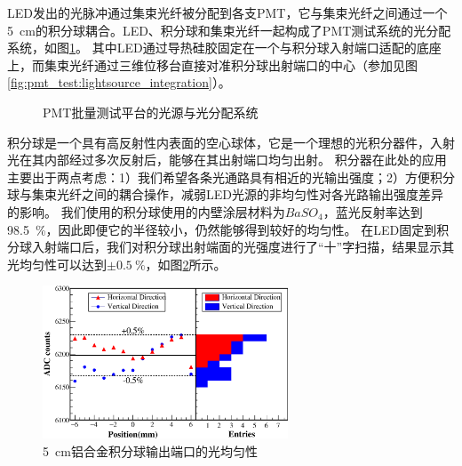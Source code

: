LED发出的光脉冲通过集束光纤被分配到各支PMT，它与集束光纤之间通过一个\SI{5}{\centi\meter}的积分球耦合。LED、积分球和集束光纤一起构成了PMT测试系统的光分配系统，如图\ref{fig:pmt_test:light_distribution}。
其中LED通过导热硅胶固定在一个与积分球入射端口适配的底座上，而集束光纤通过三维位移台直接对准积分球出射端口的中心（参加见图\ref{fig:pmt_test:lightsource_integration}）。
\begin{figure}[htbp]
	\centering
	\caption{PMT批量测试平台的光源与光分配系统}
	\label{fig:pmt_test:light_distribution}
\end{figure}
积分球是一个具有高反射性内表面的空心球体，它是一个理想的光积分器件，入射光在其内部经过多次反射后，能够在其出射端口均匀出射。
积分器在此处的应用主要出于两点考虑：1）我们希望各条光通路具有相近的光输出强度；2）方便积分球与集束光纤之间的耦合操作，减弱LED光源的非均匀性对各光路输出强度差异的影响。
我们使用的积分球\parencite{integrating_sphere}使用的内壁涂层材料为$BaSO_4$，蓝光反射率达到\SI{98.5}{\percent}，因此即便它的半径较小，仍然能够得到较好的均匀性。
在LED固定到积分球入射端口后，我们对积分球出射端面的光强度进行了“十”字扫描，结果显示其光均匀性可以达到$\pm\SI{0.5}{\percent}$，如图\ref{fig:pmt_test:integrationsphere_uniformity}所示。
\begin{figure}[htbp]
	\centering
	\includegraphics[width=0.65\textwidth]{chap/pmt_test/fig/integrationsphere_uniformity.eps}
	\caption{\SI{5}{cm}铝合金积分球输出端口的光均匀性}
	\label{fig:pmt_test:integrationsphere_uniformity}
\end{figure}

